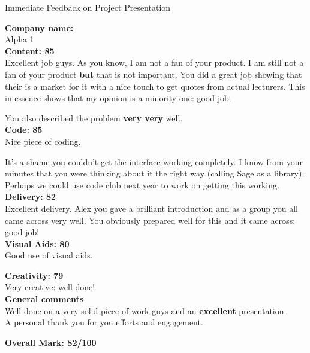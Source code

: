 \documentclass{article}
\begin{document}
\begin{center}
\Huge{Immediate Feedback on Project Presentation}\\
\end{center}


\normalsize
\textbf{Company name:}\\

Alpha 1 \\

\textbf{Content: 85}\\

Excellent job guys.
As you know, I am not a fan of your product.
I am still not a fan of your product \textbf{but} that is not important.
You did a great job showing that their is a market for it with a nice touch to get quotes from actual lecturers.
This in essence shows that my opinion is a minority one: good job.

You also described the problem \textbf{very very} well.\\

\textbf{Code: 85}\\

Nice piece of coding.

It's a shame you couldn't get the interface working completely.
I know from your minutes that you were thinking about it the right way (calling Sage as a library).
Perhaps we could use code club next year to work on getting this working.\\

\textbf{Delivery: 82}\\

Excellent delivery.
Alex you gave a brilliant introduction and as a group you all came across very well.
You obviously prepared well for this and it came across: good job!\\

\textbf{Visual Aids: 80}\\

Good use of visual aids.

\textbf{Creativity: 79}\\

Very creative: well done!\\


\textbf{General comments}\\

Well done on a very solid piece of work guys and an \textbf{excellent} presentation.\\

A personal thank you for you efforts and engagement.

\textbf{Overall Mark: 82/100}
\end{document}
